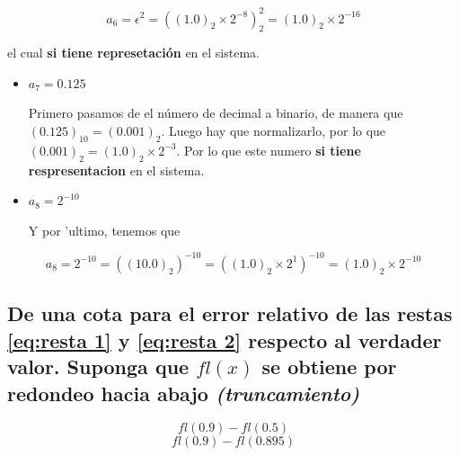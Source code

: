 \documentclass[11pt]{article}
\providecommand{\tightlist}{%
      \setlength{\itemsep}{0pt}\setlength{\parskip}{0pt}}
\begin{document}
\begin{equation} a_6 = \epsilon^2 = ((1.0)_2 \times 2^{-8})_2^2 = (1.0)_2 \times 2^{-16} 
 \end{equation}

el cual \textbf{si tiene represetación} en el sistema.

\begin{itemize}
\tightlist
\item
  \(a_7 = 0.125\)

  \par

  Primero pasamos de el número de decimal a binario, de manera que
  \((0.125)_{10} = (0.001)_{2}\). Luego hay que normalizarlo, por lo que
  \((0.001)_{2} = (1.0)_{2} \times 2^{-3}\). Por lo que este numero
  \textbf{si tiene respresentacion} en el sistema.
\item
  \(a_8 = 2^{-10}\)

  \par

  Y por 'ultimo, tenemos que
\end{itemize}

\begin{equation*} a_8 = 2^{-10} = ((10.0)_2)^{-10} = ((1.0)_2 \times 2^{1})^{-10} = (1.0)_2 \times 2^{-10}
 \end{equation*}

    \hypertarget{de-una-cota-para-el-error-relativo-de-las-restas-y-respecto-al-verdader-valor.-suponga-que-flx-se-obtiene-por-redondeo-hacia-abajo-truncamiento}{%
\subsection{\texorpdfstring{De una cota para el error relativo de las
restas \ref{eq:resta 1} y \ref{eq:resta 2} respecto al verdader valor.
Suponga que \(fl(x)\) se obtiene por redondeo hacia abajo
\emph{(truncamiento)}}{De una cota para el error relativo de las restas  y  respecto al verdader valor. Suponga que fl(x) se obtiene por redondeo hacia abajo (truncamiento)}}\label{de-una-cota-para-el-error-relativo-de-las-restas-y-respecto-al-verdader-valor.-suponga-que-flx-se-obtiene-por-redondeo-hacia-abajo-truncamiento}}

    \begin{equation}
    fl(0.9) - fl(0.5)   \label{eq:resta 1}
\end{equation} \begin{equation}
    fl(0.9) - fl(0.895) \label{eq:resta 2}
\end{equation}
\end{document}
